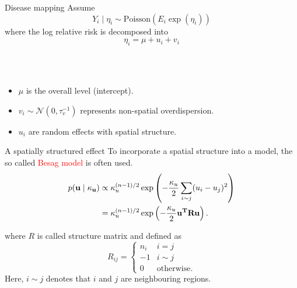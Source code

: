 \documentclass[
  ignorenonframetext,
]{beamer}
\begin{document}
\begin{frame}{Disease mapping}
\protect\hypertarget{disease-mapping-1}{}
Assume \[
Y_i \mid \eta_i \sim \text{Poisson}(E_i \exp(\eta_i))
\] where the log relative risk is decomposed into \[
\eta_i = \mu + u_i + v_i
\]\\
\strut \\

\begin{itemize}
\item
  \(\mu\) is the overall level (intercept).
\item
  \(v_i \sim \mathcal{N}(0, \tau_v^{-1})\) represents non-spatial
  overdispersion.
\item
  \(u_i\) are random effects with spatial structure.
\end{itemize}
\end{frame}

\begin{frame}{A spatially structured effect}
\protect\hypertarget{a-spatially-structured-effect}{}
To incorporate a spatial structure into a model, the so called
\textcolor{red}{Besag
model} is often used. \[
\begin{aligned}
  p( \bf{u} \mid \kappa_u)& \propto \kappa_u^{(n-1)/2} \exp\left( -
  \frac{\kappa_u}{2} \sum_{i\sim j} (u_i -u_j)^2\right)\\
  & = \kappa_u^{(n-1)/2} \exp\left( -
  \frac{\kappa_u}{2} \bf{u}^T \mathbf{R} \bf{u} \right).
\end{aligned}
\]

where \(R\) is called structure matrix and defined as \[
R_{ij} =  \begin{cases}
            n_i & i=j\\
            -1 & i \sim j\\
            0 & \text{otherwise}.
        \end{cases}
\] Here, \(i \sim j\) denotes that \(i\) and \(j\) are neighbouring
regions.
\end{frame}
\end{document}
